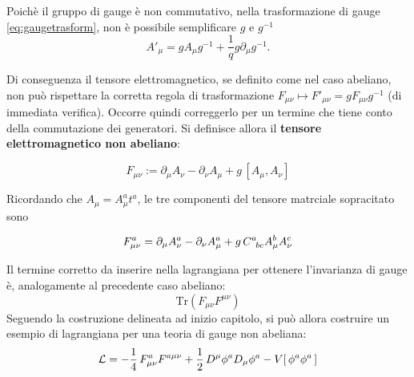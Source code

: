 Poichè il gruppo di gauge è non commutativo, nella trasformazione di gauge
\ref{eq:gaugetrasform}, non è possibile semplificare $g$ e $g^{-1}$
$$
   A'_\mu = g A_\mu g^{-1} + \frac{1}{q} g \partial _\mu g^ {-1}.
$$

Di conseguenza il tensore elettromagnetico, se definito come nel caso abeliano,
non può rispettare la corretta regola di trasformazione $F_{\mu\nu}
\mapsto F'_{\mu\nu} = g F_{\mu\nu} g^{-1}$ (di immediata verifica). Occorre quindi
correggerlo per un termine che tiene conto della commutazione dei generatori. Si
definisce allora il \textbf{tensore elettromagnetico non abeliano}:

\begin{equation}
   F _{\mu\nu} := \partial _\mu A_\nu - \partial _\nu A_\mu + g \, [A_\mu,A_\nu]
\end{equation}

Ricordando che $ A_\mu = A^a_\mu t^a $, le tre componenti del tensore matrciale sopracitato
sono

\begin{equation}
   F_{\mu\nu}^a = \partial _\mu A^a_\nu
       - \partial _\nu A^a_\mu + g \,C^{a}_{\hphantom{a}bc} A^b_\mu A^c_\nu
\end{equation}

Il termine corretto da inserire nella lagrangiana per ottenere l'invarianza di gauge
è, analogamente al precedente caso abeliano:
$$
   \mathrm{Tr}(F_{\mu\nu}F^{\mu\nu})
$$
Seguendo la costruzione delineata ad inizio capitolo, si può allora costruire
un esempio di lagrangiana per una teoria di gauge non abeliana:
\begin{equation}\label{eq:nonabelianlagrangian}
  \mathcal{L} = -\frac{1}{4} \, F^a_{\mu\nu}F^{a\mu\nu}
        + \frac{1}{2} \, D^\mu \phi^a D_\mu \phi^a
        - V[\, \phi^a \phi^a \,]
\end{equation}\\


